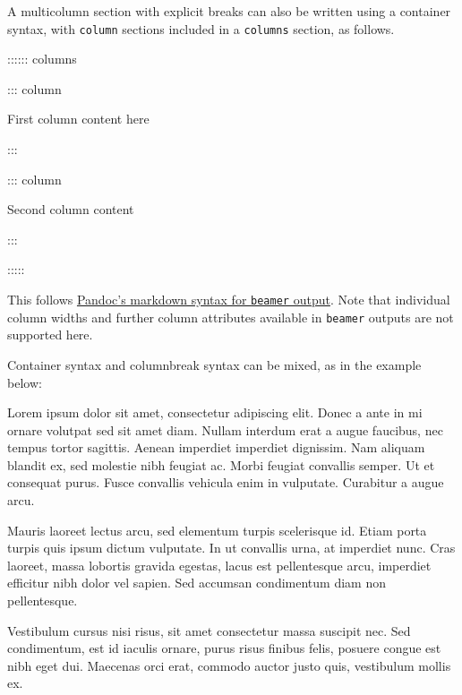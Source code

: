 \documentclass[
]{article}
\newenvironment{Shaded}{}{}
\newcommand{\NormalTok}[1]{#1}
\begin{document}
A multicolumn section with explicit breaks can also be written using a
container syntax, with \texttt{column} sections included in a
\texttt{columns} section, as follows.

\begin{Shaded}
\begin{Highlighting}[]
\NormalTok{:::::: columns}

\NormalTok{::: column}

\NormalTok{First column content here}

\NormalTok{:::}

\NormalTok{::: column}

\NormalTok{Second column content}

\NormalTok{:::}

\NormalTok{:::::}
\end{Highlighting}
\end{Shaded}

This follows \href{https://pandoc.org/MANUAL.html\#columns}{Pandoc's
markdown syntax for \texttt{beamer} output}. Note that individual column
widths and further column attributes available in \texttt{beamer}
outputs are not supported here.

Container syntax and columnbreak syntax can be mixed, as in the example
below:

{\raggedcolumns\begin{multicols}{3}

Lorem ipsum dolor sit amet, consectetur adipiscing elit. Donec a ante in
mi ornare volutpat sed sit amet diam. Nullam interdum erat a augue
faucibus, nec tempus tortor sagittis. Aenean imperdiet imperdiet
dignissim. Nam aliquam blandit ex, sed molestie nibh feugiat ac. Morbi
feugiat convallis semper. Ut et consequat purus. Fusce convallis
vehicula enim in vulputate. Curabitur a augue arcu.

\columnbreak

Mauris laoreet lectus arcu, sed elementum turpis scelerisque id. Etiam
porta turpis quis ipsum dictum vulputate. In ut convallis urna, at
imperdiet nunc. Cras laoreet, massa lobortis gravida egestas, lacus est
pellentesque arcu, imperdiet efficitur nibh dolor vel sapien. Sed
accumsan condimentum diam non pellentesque.

\columnbreak

Vestibulum cursus nisi risus, sit amet consectetur massa suscipit nec.
Sed condimentum, est id iaculis ornare, purus risus finibus felis,
posuere congue est nibh eget dui. Maecenas orci erat, commodo auctor
justo quis, vestibulum mollis ex.

\end{multicols}
}
\end{document}
